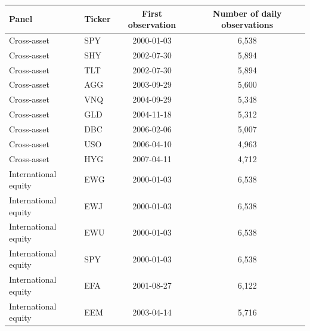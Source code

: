 \begin{tabular}{llcc}
\toprule
Panel & Ticker & First observation & Number of daily observations \\
\midrule
Cross-asset & SPY & 2000-01-03 & 6,538 \\
Cross-asset & SHY & 2002-07-30 & 5,894 \\
Cross-asset & TLT & 2002-07-30 & 5,894 \\
Cross-asset & AGG & 2003-09-29 & 5,600 \\
Cross-asset & VNQ & 2004-09-29 & 5,348 \\
Cross-asset & GLD & 2004-11-18 & 5,312 \\
Cross-asset & DBC & 2006-02-06 & 5,007 \\
Cross-asset & USO & 2006-04-10 & 4,963 \\
Cross-asset & HYG & 2007-04-11 & 4,712 \\
\midrule
International equity & EWG & 2000-01-03 & 6,538 \\
International equity & EWJ & 2000-01-03 & 6,538 \\
International equity & EWU & 2000-01-03 & 6,538 \\
International equity & SPY & 2000-01-03 & 6,538 \\
International equity & EFA & 2001-08-27 & 6,122 \\
International equity & EEM & 2003-04-14 & 5,716 \\
\bottomrule
\end{tabular}
